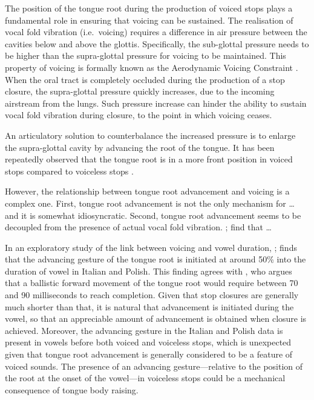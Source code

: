 \documentclass[]{JASAnew}
\begin{document}
The position of the tongue root during the production of voiced stops
plays a fundamental role in ensuring that voicing can be sustained. The
realisation of vocal fold vibration (i.e.~voicing) requires a difference
in air pressure between the cavities below and above the glottis.
Specifically, the sub-glottal pressure needs to be higher than the
supra-glottal pressure for voicing to be maintained. This property of
voicing is formally known as the Aerodynamic Voicing Constraint
\citep{ohala2011}. When the oral tract is completely occluded during the
production of a stop closure, the supra-glottal pressure quickly
increases, due to the incoming airstream from the lungs. Such pressure
increase can hinder the ability to sustain vocal fold vibration during
closure, to the point in which voicing ceases.

An articulatory solution to counterbalance the increased pressure is to
enlarge the supra-glottal cavity by advancing the root of the tongue. It
has been repeatedly observed that the tongue root is in a more front
position in voiced stops compared to voiceless stops
\citep{kent1969, perkell1969, westbury1983}.

However, the relationship between tongue root advancement and voicing is
a complex one. First, tongue root advancement is not the only mechanism
for \ldots{} and it is somewhat idiosyncratic. Second, tongue root
advancement seems to be decoupled from the presence of actual vocal fold
vibration. \citet{ahn2015}; \citet{ahn2016} find that \ldots{}

In an exploratory study of the link between voicing and vowel duration,
\citet{coretta2018f}; \citet{coretta2018d} finds that the advancing
gesture of the tongue root is initiated at around 50\% into the duration
of vowel in Italian and Polish. This finding agrees with
\citet{rothenberg1967}, who argues that a ballistic forward movement of
the tongue root would require between 70 and 90 milliseconds to reach
completion. Given that stop closures are generally much shorter than
that, it is natural that advancement is initiated during the vowel, so
that an appreciable amount of advancement is obtained when closure is
achieved. Moreover, the advancing gesture in the Italian and Polish data
is present in vowels before both voiced and voiceless stops, which is
unexpected given that tongue root advancement is generally considered to
be a feature of voiced sounds. The presence of an advancing
gesture---relative to the position of the root at the onset of the
vowel---in voiceless stops could be a mechanical consequence of tongue
body raising.
\end{document}
